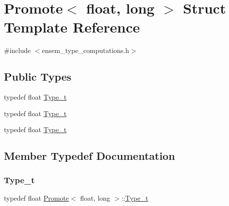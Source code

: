 \hypertarget{structPromote_3_01float_00_01long_01_4}{}\section{Promote$<$ float, long $>$ Struct Template Reference}
\label{structPromote_3_01float_00_01long_01_4}


{\ttfamily \#include $<$ensem\+\_\+type\+\_\+computations.\+h$>$}

\subsection*{Public Types}
\begin{DoxyCompactItemize}
\item 
typedef float \mbox{\hyperlink{structPromote_3_01float_00_01long_01_4_a6959e098474512ecba3473c0f5863033}{Type\+\_\+t}}
\item 
typedef float \mbox{\hyperlink{structPromote_3_01float_00_01long_01_4_a6959e098474512ecba3473c0f5863033}{Type\+\_\+t}}
\item 
typedef float \mbox{\hyperlink{structPromote_3_01float_00_01long_01_4_a6959e098474512ecba3473c0f5863033}{Type\+\_\+t}}
\end{DoxyCompactItemize}


\subsection{Member Typedef Documentation}
\mbox{\label{structPromote_3_01float_00_01long_01_4_a6959e098474512ecba3473c0f5863033}} 
\subsubsection{\texorpdfstring{Type\_t}{Type\_t}\hspace{0.1cm}{\footnotesize\ttfamily [1/3]}}
{\footnotesize\ttfamily typedef float \mbox{\hyperlink{structPromote}{Promote}}$<$ float, long $>$\+::\mbox{\hyperlink{structPromote_3_01float_00_01long_01_4_a6959e098474512ecba3473c0f5863033}{Type\+\_\+t}}}

\mbox{\label{structPromote_3_01float_00_01long_01_4_a6959e098474512ecba3473c0f5863033}} 
